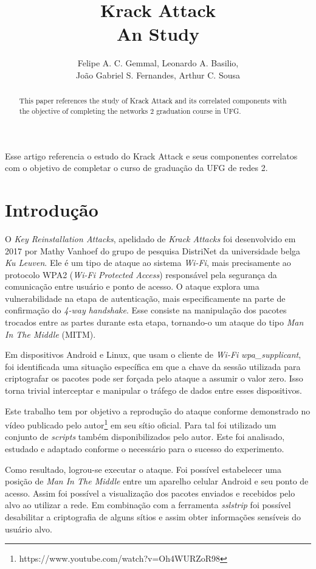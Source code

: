 \documentclass[12pt]{article}
\title{Krack Attack \\ An Study}
\author{Felipe A. C. Gemmal\inst{1}, Leonardo A. Basilio\inst{1},\\ João Gabriel S. Fernandes\inst{1}, Arthur C. Sousa\inst{1} }
\begin{document}
 

\maketitle

\begin{abstract}
	This paper references the study of Krack Attack and its correlated components with the objective of completing the networks 2 graduation course in UFG.
\end{abstract}

\begin{resumo} 
	Esse artigo referencia o estudo do Krack Attack e seus componentes correlatos com o objetivo de completar o curso de graduação da UFG de redes 2.
\end{resumo}


\section{Introdução}
O \textit{Key Reinstallation Attacks}, apelidado de \textit{Krack Attacks} \cite{vanhoef:2017} foi desenvolvido em 2017 por Mathy Vanhoef do grupo de pesquisa DistriNet da universidade belga \textit{Ku Leuven}. Ele é um tipo de ataque ao sistema \textit{Wi-Fi}, mais precisamente ao protocolo WPA2 (\textit{Wi-Fi Protected Access}) responsável pela segurança da comunicação entre usuário e ponto de acesso. O ataque explora uma vulnerabilidade na etapa de autenticação, mais especificamente na parte de confirmação do \textit{4-way handshake}. Esse consiste na manipulação dos pacotes trocados entre as partes durante esta etapa, tornando-o um ataque do tipo \textit{Man In The Middle} (MITM).

Em dispositivos Android e Linux, que usam o cliente de \textit{Wi-Fi} \textit{wpa\_supplicant}, foi identificada uma situação específica em que a chave da sessão utilizada para criptografar os pacotes pode ser forçada pelo ataque a assumir o valor zero. Isso torna trivial interceptar e manipular o tráfego de dados entre esses dispositivos.

Este trabalho tem por objetivo a reprodução do ataque conforme demonstrado no vídeo publicado pelo autor\footnote{https://www.youtube.com/watch?v=Oh4WURZoR98} em seu sítio oficial. Para tal foi utilizado um conjunto de \textit{scripts} também disponibilizados pelo autor. Este foi analisado, estudado e adaptado conforme o necessário para o sucesso do experimento. 

Como resultado, logrou-se executar o ataque. Foi possível estabelecer uma posição de \textit{Man In The Middle} entre um aparelho celular Android e seu ponto de acesso. Assim foi possível a visualização dos pacotes enviados e recebidos pelo alvo ao utilizar a rede. Em combinação com a ferramenta \textit{sslstrip} foi possível desabilitar a criptografia de alguns sítios e assim obter informações sensíveis do usuário alvo.
 
\end{document}
